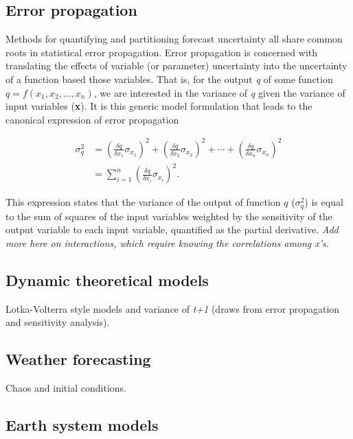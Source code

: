 \documentclass[12pt,]{article}
\begin{document}
\hypertarget{error-propagation}{%
\subsection{Error propagation}\label{error-propagation}}

Methods for quantifying and partitioning forecast uncertainty all share
common roots in statistical error propagation. Error propagation is
concerned with translating the effects of variable (or parameter)
uncertainty into the uncertainty of a function based those variables.
That is, for the output \emph{q} of some function
\(q = f(x_1,x_2,\dots,x_n)\), we are interested in the variance of
\emph{q} given the variance of input variables (\textbf{x}). It is this
generic model formulation that leads to the canonical expression of
error propagation

\begin{align}
\sigma^2_q &= \left( \frac{\delta q}{\delta x_1} \sigma_{x_1} \right)^2 + \left( \frac{\delta q}{\delta x_2} \sigma_{x_2} \right)^2 + \cdots + \left( \frac{\delta q}{\delta x_n} \sigma_{x_n} \right)^2 \\
&= \sum^n_{i=1}\left( \frac{\delta q}{\delta x_i} \sigma_{x_i} \right)^2.
\end{align}

\noindent{}This expression states that the variance of the output of
function \(q\) (\(\sigma^2_q\)) is equal to the sum of squares of the
input variables weighted by the sensitivity of the output variable to
each input variable, quantified as the partial derivative. \emph{Add
more here on interactions, which require knowing the correlations among
x's.}

\hypertarget{dynamic-theoretical-models}{%
\subsection{Dynamic theoretical
models}\label{dynamic-theoretical-models}}

Lotka-Volterra style models and variance of \emph{t+1} (draws from error
propagation and sensitivity analysis).

\hypertarget{weather-forecasting}{%
\subsection{Weather forecasting}\label{weather-forecasting}}

Chaos and initial conditions.

\hypertarget{earth-system-models}{%
\subsection{Earth system models}\label{earth-system-models}}
\end{document}
